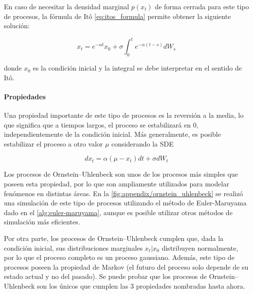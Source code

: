 En caso de necesitar la densidad marginal $p(x_t)$ de forma cerrada para este tipo de procesos, la fórmula de Itô \eqref{eq:itos_formula} permite obtener la siguiente solución:

\begin{equation*}
    x_t = e^{-\alpha t} x_0 + \sigma \int_0^t e^{-\alpha(t-s)} dW_s
\end{equation*}

donde $x_0$ es la condición inicial y la integral se debe interpretar en el sentido de Itô.

\paragraph{Propiedades}

Una propiedad importante de este tipo de procesos es la reversión a la media, lo que significa que a tiempos largos, el proceso se estabilizará en 0, independientemente de la condición inicial. Más generalmente, es posible estabilizar el proceso a otro valor $\mu$ considerando la SDE

\begin{equation*}
    dx_t = \alpha(\mu-x_t) dt + \sigma dW_t
\end{equation*}

Los procesos de Ornstein–Uhlenbeck son unos de los procesos más simples que poseen esta propiedad, por lo que son ampliamente utilizados para modelar fenómenos en distintas áreas. En la \autoref{fig:appendix/ornstein_uhlenbeck} se realizó una simulación de este tipo de procesos utilizando el método de Euler-Maruyama dado en el \autoref{alg:euler-maruyama}, aunque es posible utilizar otros métodos de simulación más eficientes.


Por otra parte, los procesos de Ornstein–Uhlenbeck cumplen que, dada la condición inicial, sus distribuciones marginales $x_t|x_0$ distribuyen normalmente, por lo que el proceso completo es un proceso gaussiano. Además, este tipo de procesos poseen la propiedad de Markov (el futuro del proceso solo depende de su estado actual y no del pasado). Se puede probar que los procesos de Ornstein–Uhlenbeck son los únicos que cumplen las 3 propiedades nombradas hasta ahora.

